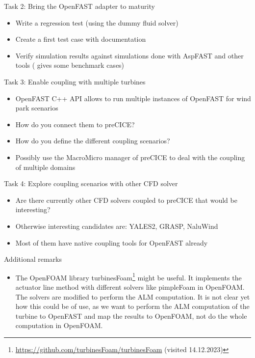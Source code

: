 Task 2: Bring the OpenFAST adapter to maturity
\begin{itemize}
	\item Write a regression test (using the dummy fluid solver)
	\item Create a first test case with documentation
	\item Verify simulation results against simulations done with AspFAST and other tools (\cite{Taschner:2022} gives some benchmark cases)\\
\end{itemize}

Task 3: Enable coupling with multiple turbines
\begin{itemize}
	\item OpenFAST C++ API allows to run multiple instances of OpenFAST for wind park scenarios
	\item How do you connect them to preCICE? 
	\item How do you define the different coupling scenarios?
	\item Possibly use the MacroMicro manager of preCICE to deal with the coupling of multiple domains\\
\end{itemize}

Task 4: Explore coupling scenarios with other CFD solver
\begin{itemize}
	\item Are there currently other CFD solvers coupled to preCICE that would be interesting?
	\item Otherwise interesting candidates are: YALES2, GRASP, NaluWind
	\item Most of them have native coupling tools for OpenFAST already\\
\end{itemize}

Additional remarks
\begin{itemize}
	\item The OpenFOAM library turbinesFoam\footnote{\url{https://github.com/turbinesFoam/turbinesFoam} (visited 14.12.2023)} \cite{Bachant:2018} might be useful. It implements the actuator line method with different solvers like pimpleFoam in OpenFOAM. The solvers are modified to perform the ALM computation. It is not clear yet how this could be of use, as we want to perform the ALM computation of the turbine to OpenFAST and map the results to OpenFOAM, not do the whole computation in OpenFOAM.
\end{itemize}
